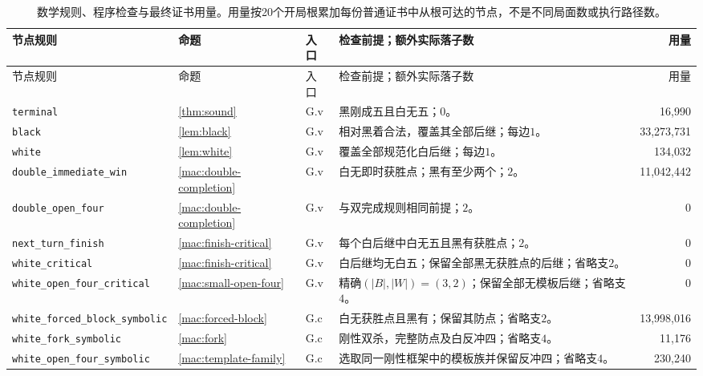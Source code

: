 \documentclass[11pt]{article}
\theoremstyle{definition}
\theoremstyle{remark}
\begin{document}
\begingroup\scriptsize\setlength{\tabcolsep}{2pt}\renewcommand{\arraystretch}{1.12}
\begin{longtable}{@{}>{\raggedright\arraybackslash}p{.25\linewidth}>{\raggedright\arraybackslash}p{.07\linewidth}>{\raggedright\arraybackslash}p{.09\linewidth}>{\raggedright\arraybackslash}p{.39\linewidth}r@{}}
\caption{数学规则、程序检查与最终证书用量。用量按20个开局根累加每份普通证书中从根可达的节点，不是不同局面数或执行路径数。}\label{tab:rule-use}\\
\toprule
节点规则 & 命题 & 入口 & 检查前提；额外实际落子数 & 用量\\
\midrule
\endfirsthead
\toprule
节点规则 & 命题 & 入口 & 检查前提；额外实际落子数 & 用量\\
\midrule
\endhead
\texttt{terminal} & \ref{thm:sound} & G.v & 黑刚成五且白无五；$0$。 & 16,990\\
\texttt{black} & \ref{lem:black} & G.v & 相对黑着合法，覆盖其全部后继；每边$1$。 & 33,273,731\\
\texttt{white} & \ref{lem:white} & G.v & 覆盖全部规范化白后继；每边$1$。 & 134,032\\
\texttt{double\_\allowbreak immediate\_\allowbreak win} & \ref{mac:double-completion} & G.v & 白无即时获胜点；黑有至少两个；$2$。 & 11,042,442\\
\texttt{double\_\allowbreak open\_\allowbreak four} & \ref{mac:double-completion} & G.v & 与双完成规则相同前提；$2$。 & 0\\
\texttt{next\_\allowbreak turn\_\allowbreak finish} & \ref{mac:finish-critical} & G.v & 每个白后继中白无五且黑有获胜点；$2$。 & 0\\
\texttt{white\_\allowbreak critical} & \ref{mac:finish-critical} & G.v & 白后继均无白五；保留全部黑无获胜点的后继；省略支$2$。 & 0\\
\texttt{white\_\allowbreak open\_\allowbreak four\_\allowbreak critical} & \ref{mac:small-open-four} & G.v & 精确$(|B|,|W|)=(3,2)$；保留全部无模板后继；省略支$4$。 & 0\\
\texttt{white\_\allowbreak forced\_\allowbreak block\_\allowbreak symbolic} & \ref{mac:forced-block} & G.c & 白无获胜点且黑有；保留其防点；省略支$2$。 & 13,998,016\\
\texttt{white\_\allowbreak fork\_\allowbreak symbolic} & \ref{mac:fork} & G.c & 刚性双杀，完整防点及白反冲四；省略支$4$。 & 11,176\\
\texttt{white\_\allowbreak open\_\allowbreak four\_\allowbreak symbolic} & \ref{mac:template-family} & G.c & 选取同一刚性框架中的模板族并保留反冲四；省略支$4$。 & 230,240\\

\end{longtable}
\end{document}

